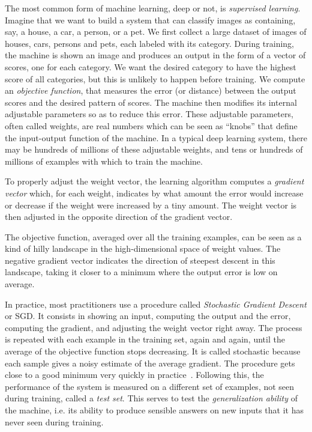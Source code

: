\documentclass[10pts]{article}
\begin{document}
The most common form of machine learning, deep or not, is {\em
  supervised learning}. Imagine that we want to build a system that
can classify images as containing, say, a house, a car, a person, or a
pet. We first collect a large dataset of images of houses, cars,
persons and pets, each labeled with its category. During training, the
machine is shown an image and produces an output in the form of
a vector of scores, one for each category. We want the desired
category to have the highest score of all categories, but this is
unlikely to happen before training.  We compute an {\em objective
  function}, that measures the error (or distance) between the output
scores and the desired pattern of scores. The machine then modifies
its internal adjustable parameters so as to reduce this error. These
adjustable parameters, often called weights, are real numbers which
can be seen as ``knobs'' that define the input-output function of the
machine. In a typical deep learning system, there may be hundreds of
millions of these adjustable weights, and tens or hundreds of millions
of examples with which to train the machine.

To properly adjust the weight vector, the learning algorithm computes
a {\em gradient vector} which, for each weight, indicates by what
amount the error would increase or decrease if the weight were
increased by a tiny amount. The weight vector is then adjusted in the
opposite direction of the gradient vector. 

The objective function, averaged over all the training examples, can
be seen as a kind of hilly landscape in the high-dimensional space of
weight values. The negative gradient vector indicates the direction of
steepest descent in this landscape, taking it closer to a minimum
where the output error is low on average.

In practice, most practitioners use a procedure called {\em Stochastic
  Gradient Descent} or SGD. It consists in showing an input, computing
the output and the error, computing the gradient, and adjusting the
weight vector right away. The process is repeated with each example in
the training set, again and again, until the average of the objective
function stops decreasing. It is called stochastic because each sample
gives a noisy estimate of the average gradient. The procedure gets
close to a good minimum very quickly in
practice~\cite{bottou-bousquet-2008-small}. Following this, the
performance of the system is measured on a different set of examples,
not seen during training, called a {\em test set}. This serves to test
the {\em generalization ability} of the machine, i.e. its ability to
produce sensible answers on new inputs that it has never seen during
training.
\end{document}
